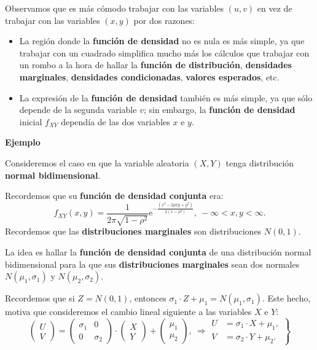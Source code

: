 \documentclass[
  letterpaper,
  DIV=11,
  numbers=noendperiod]{scrreprt}
\providecommand{\tightlist}{%
  \setlength{\itemsep}{0pt}\setlength{\parskip}{0pt}}\usepackage{longtable,booktabs,array}
\begin{document}
Observamos que es más cómodo trabajar con las variables \((u,v)\) en vez
de trabajar con las variables \((x,y)\) por dos razones:

\begin{itemize}
\tightlist
\item
  La región donde la \textbf{función de densidad} no es nula es más
  simple, ya que trabajar con un cuadrado simplifica mucho más los
  cálculos que trabajar con un rombo a la hora de hallar la
  \textbf{función de distribución}, \textbf{densidades marginales},
  \textbf{densidades condicionadas}, \textbf{valores esperados}, etc.
\item
  La expresión de la \textbf{función de densidad} también es más simple,
  ya que sólo depende de la segunda variable \(v\); sin embargo, la
  \textbf{función de densidad} inicial \(f_{XY}\) dependía de las dos
  variables \(x\) e \(y\).
\end{itemize}

\textbf{Ejemplo}

Consideremos el caso en que la variable aleatoria \((X,Y)\) tenga
distribución \textbf{normal bidimensional}.

Recordemos que su \textbf{función de densidad conjunta} era: \[
f_{XY}(x,y)=\frac{1}{2\pi\sqrt{1-\rho^2}}\mathrm{e}^{-\frac{(x^2-2\rho xy+y^2)}{2(1-\rho^2)}},\ -\infty <x,y<\infty.
\] Recordemos que las \textbf{distribuciones marginales} son
distribuciones \(N(0,1)\).

La idea es hallar la \textbf{función de densidad conjunta} de una
distribución normal bidimensional para la que sus \textbf{distribuciones
marginales} sean dos normales \(N(\mu_1,\sigma_1)\) y
\(N(\mu_2,\sigma_2)\).

Recordemos que si \(Z=N(0,1)\), entonces
\(\sigma_1\cdot Z+\mu_1 =N(\mu_1,\sigma_1)\). Este hecho, motiva que
consideremos el cambio lineal siguiente a las variables \(X\) e \(Y\):
\[
\begin{pmatrix}U\\ V\end{pmatrix}=\begin{pmatrix}\sigma_1 & 0\\ 0& \sigma_2\end{pmatrix}\cdot\begin{pmatrix}X\\ Y\end{pmatrix}+\begin{pmatrix}\mu_1\\\mu_2\end{pmatrix},\ \Rightarrow \left.\begin{array}{rl}U & = \sigma_1\cdot X+\mu_1,\\ V & =\sigma_2\cdot Y+\mu_2.\end{array}\right\}
\]
\end{document}
